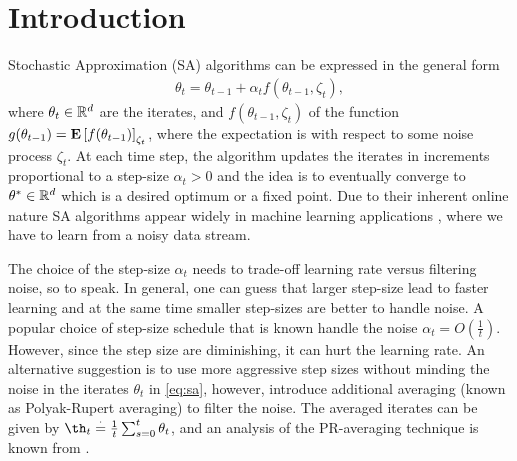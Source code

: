 \section{Introduction}
Stochastic Approximation (SA) algorithms can be expressed in the general form
\begin{align}\label{eq:sa}
\theta_t=\theta_{t-1}+\alpha_t f(\theta_{t-1},\zeta_t),
\end{align}
where $\theta_t\in \mathbb{R}^d$ are the iterates, and $f(\theta_{t-1},\zeta_t)$ of the function $g(\theta_{t-1})=\mathbf{E}\left[f(\theta_{t-1})\right]_{\zeta_t}$, where the expectation is with respect to some noise process $\zeta_t$. At each time step, the algorithm updates the iterates in increments proportional to a step-size $\alpha_t>0$ and the idea is to eventually converge to $\theta^*\in \mathbb{R}^d$ which is a desired optimum or a fixed point. Due to their inherent online nature SA algorithms appear widely in machine learning applications \cite{konda,bhatnagar,borkar,gtd,td,bach}, where we have to learn from a noisy data stream.\par
The choice of the step-size $\alpha_t$ needs to trade-off learning rate versus filtering noise, so to speak. In general, one can guess that larger step-size lead to faster learning and at the same time smaller step-sizes are better to handle noise. A popular choice of step-size schedule that is known handle the noise $\alpha_t=O(\frac{1}{t})$. However, since the step size are diminishing, it can hurt the learning rate. An alternative suggestion is to use more aggressive step sizes without minding the noise in the iterates $\theta_t$ in \eqref{eq:sa}, however, introduce additional averaging (known as Polyak-Rupert averaging) to filter the noise. The averaged iterates can be given by $\th_t\eqdef\frac{1}{t}\sum_{s=0}^t \theta_t$, and an analysis of the PR-averaging technique is known from \cite{}.\par

